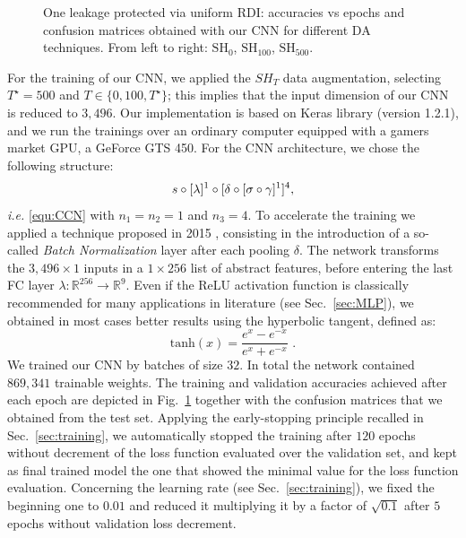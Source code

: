\begin{figure}[t]
\caption[Software misalignment: accuracies vs epochs and confusion matrices obtained with our CNN for different DA techniques.]{One leakage protected via uniform RDI: accuracies vs epochs and confusion matrices obtained with our CNN for different DA techniques. From left to right: $\mathrm{SH}_0$, $\mathrm{SH}_{100}$, $\mathrm{SH}_{500}$. }\label{fig:CW_shift_history}
\end{figure}

For the training of our CNN, we applied the $SH_T$ data augmentation, selecting $T^\star = 500$ and $T \in \{ 0,100, T^\star\}$; this implies that the input dimension of our CNN is reduced to $3,496$. Our implementation is based on Keras library \cite{keras} (version 1.2.1), and we run the trainings over an ordinary computer equipped with a gamers market GPU, a GeForce GTS 450. For the CNN architecture, we chose the following structure: 
\begin{equation}\label{eq:archi}
  s \circ [\lambda]^1 \circ[\delta \circ [\sigma \circ \gamma  ]^1 ]^4,   
\end{equation}
\emph{i.e.} \eqref{equ:CCN} with $n_1 = n_2 = 1$ and $n_3 = 4$.
To accelerate the training we applied a technique proposed in 2015 \cite{batch_norm}, consisting in the  introduction of a so-called \emph{Batch Normalization} layer \cite{batch_norm} after each pooling $\delta$. The network transforms the $3,496 \times 1$ inputs in a $1 \times 256$ list of abstract features, before entering the last FC layer $\lambda:\mathbb{R}^{256}\rightarrow \mathbb{R}^9$. Even if the ReLU activation function \cite{nair2010rectified} is classically recommended for many applications in literature (see Sec.~\ref{sec:MLP}), we obtained in most cases better results using the hyperbolic tangent, defined as:
\begin{equation}
\mathrm{tanh}(x) = \frac{e^x-e^{-x}}{e^x+e^{-x}} \mbox{ .}
\end{equation}
We trained our CNN by batches of size $32$.  In total the network contained $869,341$ trainable weights. The training and validation accuracies achieved after each epoch are depicted in Fig.~\ref{fig:CW_shift_history} together with the confusion matrices that we obtained from the test set. Applying the early-stopping principle recalled in Sec.~\ref{sec:training},  we automatically stopped the training after $120$ epochs without decrement of the loss function evaluated over the validation set, and kept as final trained model the one that showed the minimal value for the loss function evaluation. Concerning the learning rate (see Sec.~\ref{sec:training}), we fixed the beginning one to $0.01$ and reduced it multiplying it by a factor of $\sqrt{0.1}$ after $5$ epochs without validation loss decrement.


